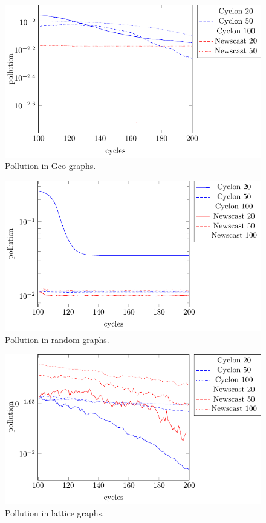 \documentclass[a4paper]{ifacconf}
\begin{document}
\begin{figure}[p]
    \centering
    \includegraphics[width=.9\linewidth]{"figures/pollution/pollution geo"}
    \caption{Pollution in Geo graphs.}
    \label{fig:pollution-geo}
\end{figure}
\begin{figure}[p]
    \centering
    \includegraphics[width=.9\linewidth]{"figures/pollution/pollution random"}
    \caption{Pollution in random graphs.}
    \label{fig:pollution-random}
\end{figure}
\begin{figure}[p]
    \centering
    \includegraphics[width=.9\linewidth]{"figures/pollution/pollution lattice"}
    \caption{Pollution in lattice graphs.}
    \label{fig:pollution-lattice}
\end{figure}
\end{document}
